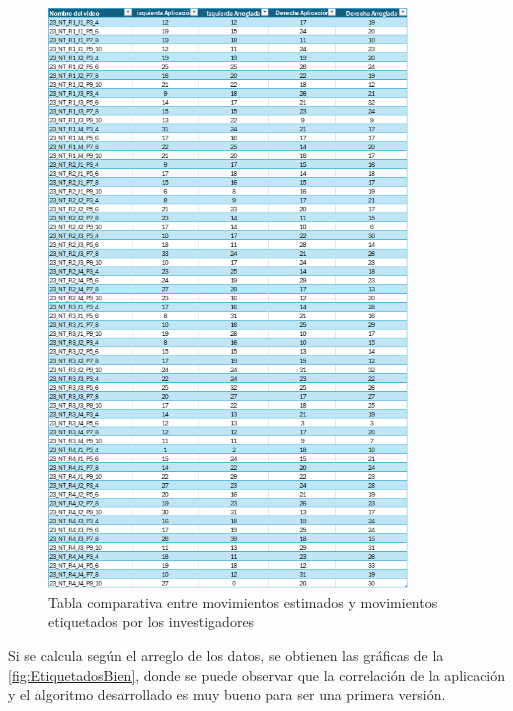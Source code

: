 \begin{figure}[H]
    \centering
    \includegraphics[width=0.85\textwidth]{images/7/ValidacionMovimientos.png}
    \caption{Tabla comparativa entre movimientos estimados y movimientos etiquetados por los investigadores}
    \label{fig:TablaResultados}
\end{figure}
\clearpage
Si se calcula según el arreglo de los datos, se obtienen las gráficas de la \autoref{fig:EtiquetadosBien}, donde se puede observar que la correlación de la aplicación y el algoritmo desarrollado es muy bueno para ser una primera versión.

